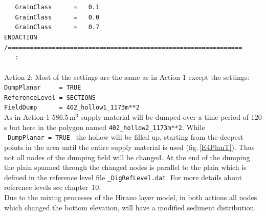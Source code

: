 \hspace*{3mm} \texttt{\small{~~~GrainClass~~~~~~=~~~0.1}}                                       \\
\hspace*{3mm} \texttt{\small{~~~GrainClass~~~~~~=~~~0.0}}                                       \\
\hspace*{3mm} \texttt{\small{~~~GrainClass~~~~~~=~~~0.7}}                                       \\
\hspace*{3mm} \texttt{\small{ENDACTION}}                                                        \\
\hspace*{3mm} \texttt{\small{/================================================================}}\\
\hspace*{3mm} \texttt{\small{~~~:}}\\
\\
Action-2: \hspace*{5mm} Most of the settings are the same as in Action-1 except the settings:\\
\hspace*{5mm}\texttt{DumpPlanar~~~~~=~TRUE}\\
\hspace*{5mm}\texttt{ReferenceLevel~=~SECTIONS}\\
\hspace*{5mm}\texttt{FieldDump~~~~~~=~402\_hollow1\_1173m**2}\\
As in Action-1 586.5\,m$^3$ supply material will be dumped over a time period of 120 s but here in the polygon
named \texttt{402\_hollow2\_1173m**2}.
While \texttt{~DumpPlanar~=~TRUE~} the hollow will be filled up, starting from the deepest points in
the area until the entire supply material is used (fig.\,\ref{E4PlanT}).
Thus not all nodes of the dumping field will be changed.
At the end of the dumping the plain spanned through the changed nodes is parallel to the plain
which is defined in the reference level file \texttt{\_DigRefLevel.dat}.
For more details about reference levels see chapter~10.\\
Due to the mixing processes of the Hirano layer model, in both actions all nodes which changed the bottom elevation,
will have a modified sediment distribution.


